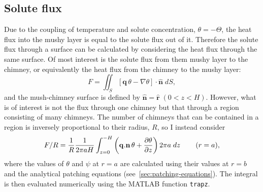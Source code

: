 \documentclass[11pt]{proc}
\begin{document}
\begin{appendices}
  \section{Solute flux} \label{app:solute-flux}
Due to the coupling of temperature and solute concentration, $\theta=-\Theta$, the heat flux into the mushy layer is equal to the solute flux out of it. Therefore the solute flux through a surface can be calculated by considering the heat flux through the same surface. Of most interest is the solute flux from them mushy layer to the chimney, or equivalently the heat flux from the chimney to the mushy layer:
\begin{equation}
F = \iint_S \left[ \mathbf{q} \, \theta - \nabla \theta \right] \cdot \mathbf{\hat{n}} \; dS,
\end{equation}
and the mush-chimney surface is defined by $\mathbf{\hat{n}} = \mathbf{\hat{r}} \; (0 < z < H) $. However, what is of interest is not the flux through one chimney but that through a region consisting of many chimneys. The number of chimneys that can be contained in a region is inversely proportional to their radius, $R$, so I instead consider
 \begin{equation}
F/R = \frac{1}{R} \frac{1}{2 \pi a H} \int_{z=0}^{-H} \left( \mathbf{q}.\mathbf{n} \, \theta + \frac{\partial \theta}{\partial z} \right) 2 \pi a \; dz \hspace{5ex} (r=a),
\end{equation}
where the values of $\theta$ and $\psi$ at $r=a$ are calculated using their values at $r=b$ and the analytical patching equations (see~\autoref{sec:patching-equations}). The integral is then evaluated numerically using the MATLAB function \texttt{trapz}.













\end{appendices}
\end{document}
